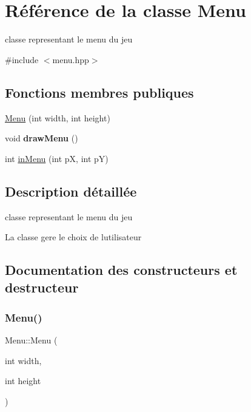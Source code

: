 \hypertarget{class_menu}{}\section{Référence de la classe Menu}
\label{class_menu}


classe representant le menu du jeu  




{\ttfamily \#include $<$menu.\+hpp$>$}

\subsection*{Fonctions membres publiques}
\begin{DoxyCompactItemize}
\item 
\hyperlink{class_menu_ad2ef20b4f4ead813387038e6b6544693}{Menu} (int width, int height)
\item 
\mbox{\label{class_menu_a9df102abcebc51e69c4728dc3d3c3be0}} 
void {\bfseries draw\+Menu} ()
\item 
int \hyperlink{class_menu_a2d91c4ae364b19291b5fca774c14f634}{in\+Menu} (int pX, int pY)
\end{DoxyCompactItemize}


\subsection{Description détaillée}
classe representant le menu du jeu 

La classe gere le choix de l\textquotesingle{}utilisateur 

\subsection{Documentation des constructeurs et destructeur}
\mbox{\label{class_menu_ad2ef20b4f4ead813387038e6b6544693}} 
\subsubsection{\texorpdfstring{Menu()}{Menu()}}
{\footnotesize\ttfamily Menu\+::\+Menu (\begin{DoxyParamCaption}\item[{int}]{width,  }\item[{int}]{height }\end{DoxyParamCaption})}


